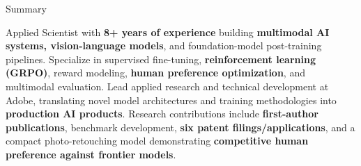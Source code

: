 \documentclass{resume}
\begin{document}
\enlargethispage{\baselineskip}


\begin{rSection}{Summary}
\raggedright
Applied Scientist with {\bf 8+ years of experience} building {\bf multimodal AI systems, \mbox{vision-language} models}, and \mbox{foundation-model} \mbox{post-training} pipelines. Specialize in supervised \mbox{fine-tuning}, {\bf reinforcement learning (GRPO)}, reward modeling, {\bf human preference optimization}, and multimodal evaluation. Lead applied research and technical development at Adobe, translating novel model architectures and training methodologies into {\bf production AI products}. Research contributions include {\bf \mbox{first-author} publications}, benchmark development, {\bf six patent filings/applications}, and a compact \mbox{photo-retouching} model demonstrating {\bf competitive human preference against frontier models}.
\end{rSection}

\end{document}

